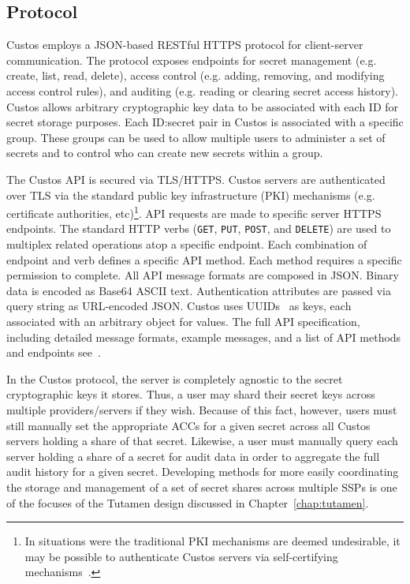 \subsection{Protocol}

Custos employs a JSON-based RESTful HTTPS protocol for client-server
communication. The protocol exposes endpoints for secret management
(e.g. create, list, read, delete), access control (e.g. adding,
removing, and modifying access control rules), and auditing
(e.g. reading or clearing secret access history). Custos allows
arbitrary cryptographic key data to be associated with each ID for
secret storage purposes. Each ID:secret pair in Custos is associated
with a specific group. These groups can be used to allow multiple
users to administer a set of secrets and to control who can create new
secrets within a group.

The Custos API is secured via TLS/HTTPS. Custos servers are
authenticated over TLS via the standard public key infrastructure
(PKI) mechanisms (e.g. certificate authorities, etc)\footnote{In
  situations were the traditional PKI mechanisms are deemed
  undesirable, it may be possible to authenticate Custos servers via
  self-certifying mechanisms~\cite{ellison1996, mazieres1999}.}. API
requests are made to specific server HTTPS endpoints. The standard
HTTP verbs (\texttt{GET}, \texttt{PUT}, \texttt{POST}, and
\texttt{DELETE}) are used to multiplex related operations atop a
specific endpoint. Each combination of endpoint and verb defines a
specific API method. Each method requires a specific permission to
complete. All API message formats are composed in JSON. Binary data is
encoded as Base64 ASCII text. Authentication attributes are passed via
query string as URL-encoded JSON. Custos uses UUIDs~\cite{leach2005}
as keys, each associated with an arbitrary object for values. The full
API specification, including detailed message formats, example
messages, and a list of API methods and endpoints
see~\cite{custos-masters}.

In the Custos protocol, the server is completely agnostic to the
secret cryptographic keys it stores. Thus, a user may shard their
secret keys across multiple providers/servers if they wish. Because of
this fact, however, users must still manually set the appropriate ACCs
for a given secret across all Custos servers holding a share of that
secret. Likewise, a user must manually query each server holding a
share of a secret for audit data in order to aggregate the full audit
history for a given secret. Developing methods for more easily
coordinating the storage and management of a set of secret shares
across multiple SSPs is one of the focuses of the Tutamen design
discussed in Chapter~\ref{chap:tutamen}.

